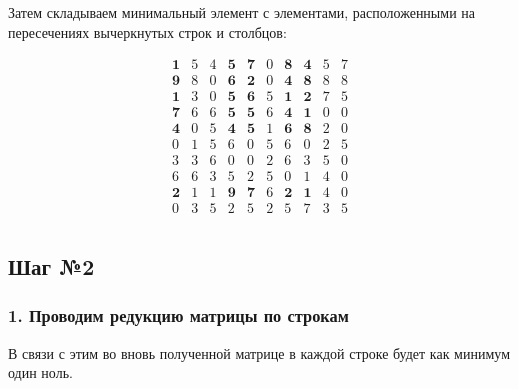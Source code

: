 \documentclass[17pt]{extarticle}
\begin{document}
Затем складываем минимальный элемент с элементами, расположенными на пересечениях вычеркнутых строк и столбцов:

\[
    \begin{array}{*{10}{c}}
        \textbf{1} & 5 & 4 & \textbf{5} & \textbf{7} & 0 & \textbf{8} & \textbf{4} & 5 & 7 \\
        \textbf{9} & 8 & 0 & \textbf{6} & \textbf{2} & 0 & \textbf{4} & \textbf{8} & 8 & 8 \\
        \textbf{1} & 3 & 0 & \textbf{5} & \textbf{6} & 5 & \textbf{1} & \textbf{2} & 7 & 5 \\
        \textbf{7} & 6 & 6 & \textbf{5} & \textbf{5} & 6 & \textbf{4} & \textbf{1} & 0 & 0 \\
        \textbf{4} & 0 & 5 & \textbf{4} & \textbf{5} & 1 & \textbf{6} & \textbf{8} & 2 & 0 \\
        0          & 1 & 5 & 6          & 0          & 5 & 6          & 0          & 2 & 5 \\
        3          & 3 & 6 & 0          & 0          & 2 & 6          & 3          & 5 & 0 \\
        6          & 6 & 3 & 5          & 2          & 5 & 0          & 1          & 4 & 0 \\
        \textbf{2} & 1 & 1 & \textbf{9} & \textbf{7} & 6 & \textbf{2} & \textbf{1} & 4 & 0 \\
        0          & 3 & 5 & 2          & 5          & 2 & 5          & 7          & 3 & 5 \\
    \end{array}
\]

\subsection*{Шаг №2}

\subsubsection*{1. Проводим редукцию матрицы по строкам}

В связи с этим во вновь полученной матрице в каждой строке будет как минимум один ноль.
\end{document}
